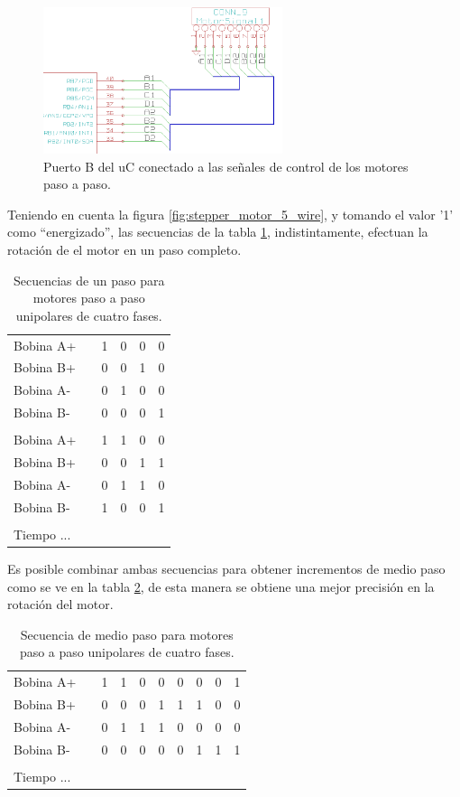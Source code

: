 \begin{figure}[htp]
\centering
\includegraphics[width=7cm]{./img/uc_portb_motors.png}
\caption{Puerto B del uC conectado a las se\~nales de control de los motores
paso a paso.}
\label{fig:uc_portb_motors}
\end{figure}


Teniendo en cuenta la figura \ref{fig:stepper_motor_5_wire}, y tomando el
valor '1' como ``energizado'', las secuencias de la tabla
\ref{tab:seq_motors_1}, indistintamente, efectuan la rotaci\'on de el motor en
un paso completo.

\begin{table}[htp]
\centering
\begin{tabular}{l c|c|c|c|c|}
Bobina A+ & & 1 & 0 & 0 & 0 \\	
Bobina B+ & & 0 & 0 & 1 & 0 \\
Bobina A- &	& 0 & 1 & 0 & 0 \\
Bobina B- &	& 0 & 0 & 0 & 1 \\
							\\
Bobina A+ & & 1 & 1 & 0 & 0 \\
Bobina B+ &	& 0 & 0 & 1 & 1 \\
Bobina A- &	& 0 & 1 & 1 & 0 \\ 
Bobina B- &	& 1 & 0 & 0 & 1 \\
							\\
Tiempo	...					\\
\end{tabular}
\caption{Secuencias de un paso para motores paso a paso unipolares de cuatro
fases.}
\label{tab:seq_motors_1}
\end{table}

Es posible combinar ambas secuencias para obtener incrementos de medio paso
como se ve en la tabla \ref{tab:seq_motors_2}, de esta manera se obtiene una
mejor precisi\'on en la rotaci\'on del motor.

\begin{table}[htp]
\centering
\begin{tabular}{l c|c|c|c|c|c|c|c|c|}
Bobina A+ & & 1 & 1 & 0 & 0 & 0 & 0 & 0 & 1\\	
Bobina B+ & & 0 & 0 & 0 & 1 & 1 & 1 & 0 & 0\\
Bobina A- &	& 0 & 1 & 1 & 1 & 0 & 0 & 0 & 0\\
Bobina B- &	& 0 & 0 & 0 & 0 & 0 & 1 & 1 & 1\\
							\\
Tiempo	...					\\
\end{tabular}
\caption{Secuencia de medio paso para motores paso a paso unipolares de cuatro
fases.}
\label{tab:seq_motors_2}
\end{table}



